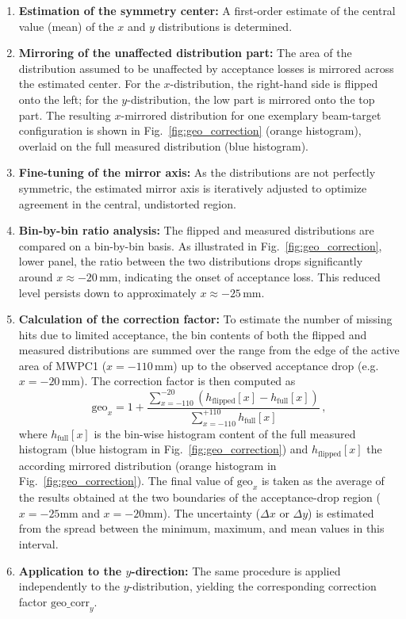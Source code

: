 \begin{enumerate}
    \item \textbf{Estimation of the symmetry center:}  
    A first-order estimate of the central value (mean) of the $x$ and $y$ distributions is determined.

    \item \textbf{Mirroring of the unaffected distribution part:}  
    The area of the distribution assumed to be unaffected by acceptance losses is mirrored across the estimated center. For the $x$-distribution, the right-hand side is flipped onto the left; for the $y$-distribution, the low part is mirrored onto the top part. The resulting $x$-mirrored distribution for one exemplary beam-target configuration is shown in Fig.~\ref{fig:geo_correction} (orange histogram), overlaid on the full measured distribution (blue histogram).

    \item \textbf{Fine-tuning of the mirror axis:}  
    As the distributions are not perfectly symmetric, the estimated mirror axis is iteratively adjusted to optimize agreement in the central, undistorted region.

    \item \textbf{Bin-by-bin ratio analysis:}  
    The flipped and measured distributions are compared on a bin-by-bin basis. As illustrated in Fig.~\ref{fig:geo_correction}, lower panel, the ratio between the two distributions drops significantly around $x \approx -20\,\text{mm}$, indicating the onset of acceptance loss. This reduced level persists down to approximately $x \approx -25\,\text{mm}$.

    \item \textbf{Calculation of the correction factor:}  
    To estimate the number of missing hits due to limited acceptance, the bin contents of both the flipped and measured distributions are summed over the range from the edge of the active area of MWPC1 ($x = -110\,\text{mm}$) up to the observed acceptance drop (e.g. $x = -20\,\text{mm}$). The correction factor is then computed as
    \begin{equation}
        \text{geo}_{x} = 1 + \frac{\sum_{x = -110}^{-20} (h_{\text{flipped}}[x] - h_{\text{full}}[x])}{\sum_{x = -110}^{ +110} h_{\text{full}}[x]} \, ,
    \end{equation}
    where $h_{\text{full}}[x]$ is the bin-wise histogram content of the full measured histogram (blue histogram in Fig.~\ref{fig:geo_correction}) and $h_{\text{flipped}}[x]$ the according mirrored distribution (orange histogram in Fig.~\ref{fig:geo_correction}). 
	The final value of $\text{geo}_x$ is taken as the average of the results obtained at the two boundaries of the acceptance-drop region ($x = -25\text{mm}$ and $x = -20\text{mm}$). The uncertainty ($\Delta x$ or $\Delta y$) is estimated from the spread between the minimum, maximum, and mean values in this interval.

    \item \textbf{Application to the $y$-direction:}  
    The same procedure is applied independently to the $y$-distribution, yielding the corresponding correction factor $\text{geo\_corr}_y$.
\end{enumerate}
